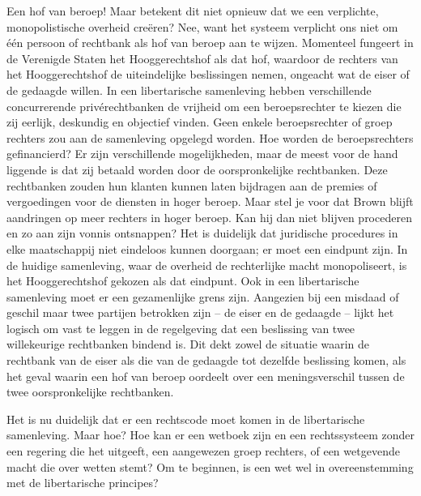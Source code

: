\documentclass[
  a5paper,
  smalldemyvopaper,10pt,twoside,onecolumn,openright,extrafontsizes,hidelinks]{memoir}
\begin{document}
Een hof van beroep! Maar betekent dit niet opnieuw dat we een
verplichte, monopolistische overheid creëren? Nee, want het systeem
verplicht ons niet om één persoon of rechtbank als hof van beroep aan te
wijzen. Momenteel fungeert in de Verenigde Staten het Hooggerechtshof
als dat hof, waardoor de rechters van het Hooggerechtshof de
uiteindelijke beslissingen nemen, ongeacht wat de eiser of de gedaagde
willen. In een libertarische samenleving hebben verschillende
concurrerende privérechtbanken de vrijheid om een beroepsrechter te
kiezen die zij eerlijk, deskundig en objectief vinden. Geen enkele
beroepsrechter of groep rechters zou aan de samenleving opgelegd worden.
Hoe worden de beroepsrechters gefinancierd? Er zijn verschillende
mogelijkheden, maar de meest voor de hand liggende is dat zij betaald
worden door de oorspronkelijke rechtbanken. Deze rechtbanken zouden hun
klanten kunnen laten bijdragen aan de premies of vergoedingen voor de
diensten in hoger beroep. Maar stel je voor dat Brown blijft aandringen
op meer rechters in hoger beroep. Kan hij dan niet blijven procederen en
zo aan zijn vonnis ontsnappen? Het is duidelijk dat juridische
procedures in elke maatschappij niet eindeloos kunnen doorgaan; er moet
een eindpunt zijn. In de huidige samenleving, waar de overheid de
rechterlijke macht monopoliseert, is het Hooggerechtshof gekozen als dat
eindpunt. Ook in een libertarische samenleving moet er een gezamenlijke
grens zijn. Aangezien bij een misdaad of geschil maar twee partijen
betrokken zijn -- de eiser en de gedaagde -- lijkt het logisch om vast
te leggen in de regelgeving dat een beslissing van twee willekeurige
rechtbanken bindend is. Dit dekt zowel de situatie waarin de rechtbank
van de eiser als die van de gedaagde tot dezelfde beslissing komen, als
het geval waarin een hof van beroep oordeelt over een meningsverschil
tussen de twee oorspronkelijke rechtbanken.

Het is nu duidelijk dat er een rechtscode moet komen in de libertarische
samenleving. Maar hoe? Hoe kan er een wetboek zijn en een rechtssysteem
zonder een regering die het uitgeeft, een aangewezen groep rechters, of
een wetgevende macht die over wetten stemt? Om te beginnen, is een wet
wel in overeenstemming met de libertarische principes?
\end{document}
